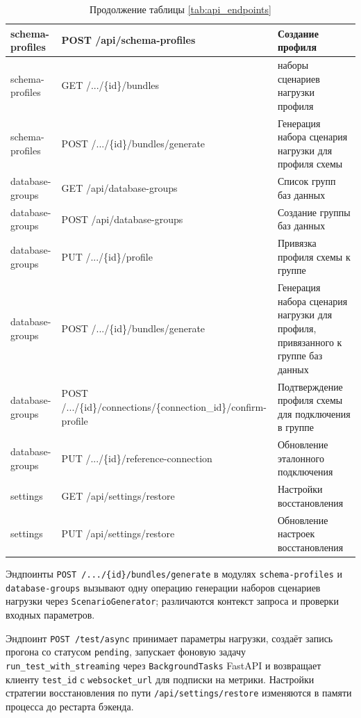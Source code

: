 \begin{table}
    \centering
    \ContinuedFloat
    \caption*{Продолжение таблицы \ref{tab:api_endpoints}}
    \label{tab:api_endpoints_continue}
    \begin{tabularx}{\textwidth}{|>{\RaggedRight}X|>{\RaggedRight}X|>{\RaggedRight}X|}
        \hline
        schema-profiles & POST /api/schema-profiles & Создание профиля \\
        \hline
        schema-profiles & GET /.../\{id\}/bundles & наборы сценариев нагрузки профиля \\
        \hline
        schema-profiles & POST /.../\{id\}/bundles/generate & Генерация набора сценария нагрузки для профиля схемы \\
        \hline
        database-groups & GET /api/database-groups & Список групп баз данных \\
        \hline
        database-groups & POST /api/database-groups & Создание группы баз данных \\
        \hline
        database-groups & PUT /.../\{id\}/profile & Привязка профиля схемы к группе \\
        \hline
        database-groups & POST /.../\{id\}/bundles/generate & Генерация набора сценария нагрузки для профиля, привязанного к группе баз данных \\
        \hline
        database-groups & POST /.../\{id\}/connections/\allowbreak\{connection\_id\}/confirm-profile & Подтверждение профиля схемы для подключения в группе \\
        \hline
        database-groups & PUT /.../\{id\}/reference-connection & Обновление эталонного подключения \\
        \hline
        settings & GET /api/settings/restore & Настройки восстановления \\
        \hline
        settings & PUT /api/settings/restore & Обновление настроек восстановления \\
        \hline
    \end{tabularx}
\end{table}

Эндпоинты \texttt{POST /.../\{id\}/bundles/generate} в модулях \texttt{schema-profiles} и \texttt{database-groups} вызывают одну операцию генерации наборов сценариев нагрузки через \texttt{ScenarioGenerator}; различаются контекст запроса и проверки входных параметров.

Эндпоинт \texttt{POST /test/async} принимает параметры нагрузки, создаёт запись прогона со статусом \texttt{pending}, запускает фоновую задачу \texttt{run\_test\_with\_streaming} через \texttt{BackgroundTasks} FastAPI и возвращает клиенту \texttt{test\_id} с \texttt{websocket\_url} для подписки на метрики. Настройки стратегии восстановления по пути \texttt{/api/settings/restore} изменяются в памяти процесса до рестарта бэкенда.

